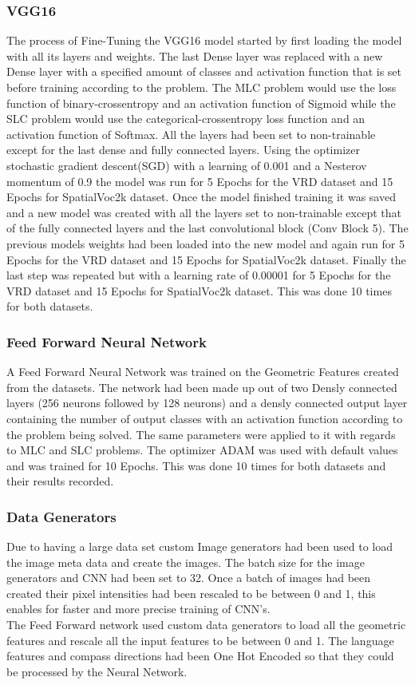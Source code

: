 \documentclass{csfyp}
\begin{document}
\subsubsection{VGG16}
The process of Fine-Tuning the VGG16 model started by first loading the model with all its layers and weights. The last Dense layer was replaced with a new Dense layer with a specified amount of classes and activation function that is set before training according to the problem. The MLC problem would use the loss function of binary-crossentropy  and an activation function of Sigmoid while the SLC problem would use the categorical-crossentropy loss function and an activation function of Softmax. All the layers had been set to non-trainable except for the last dense and fully connected layers. Using the optimizer stochastic gradient descent(SGD) with a learning of 0.001 and a Nesterov momentum of 0.9 the model was run for 5 Epochs for the VRD dataset and 15 Epochs for SpatialVoc2k dataset. Once the model finished training it was saved and a new model was created with all the layers set to non-trainable except that of the fully connected layers and the last convolutional block (Conv Block 5). The previous models weights had been loaded into the new model and again run for 5 Epochs for the VRD dataset and 15 Epochs for SpatialVoc2k dataset. Finally the last step was repeated but with a learning rate of 0.00001 for 5 Epochs for the VRD dataset and 15 Epochs for SpatialVoc2k dataset. This was done 10 times for both datasets.

\subsubsection{Feed Forward Neural Network}
A Feed Forward Neural Network was trained on the Geometric Features created from the datasets. The network had been made up out of two Densly connected layers (256 neurons followed by 128 neurons) and a densly connected output layer containing the number of output classes with an activation function according to the problem being solved. The same parameters were applied to it with regards to MLC and SLC problems. The optimizer ADAM was used with default values and was trained for 10 Epochs. This was done 10 times for both datasets and their results recorded.

\subsubsection{Data Generators}
Due to having a large data set custom Image generators had been used to load the image meta data and create the images. The batch size for the image generators and CNN had been set to 32. Once a batch of images had been created their pixel intensities had been rescaled to be between 0 and 1, this enables for faster and more precise training of CNN’s.
\\
The Feed Forward network used custom data generators to load all the geometric features and rescale all the input features to be between 0 and 1. The language features and compass directions had been One Hot Encoded so that they could be processed by the Neural Network.
\end{document}

